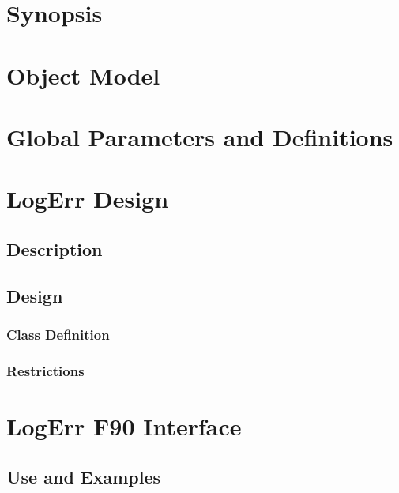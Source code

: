 \documentclass[]{article}
\begin{document}

\newpage
\tableofcontents
\newpage
\section{Synopsis}

%
\section{Object Model}

\section{Global Parameters and Definitions}


\section{LogErr Design}
\subsection{Description}

\subsection{Design}

\subsubsection{Class Definition}

\subsubsection{Restrictions}

\section{LogErr F90 Interface}
\subsection{Use and Examples}


\end{document}

